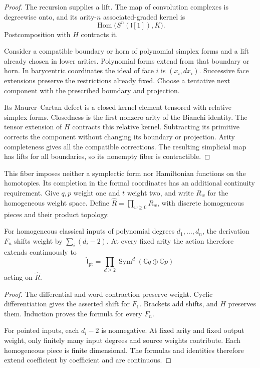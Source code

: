 \begin{proof}
The recursion supplies a lift. The map of convolution complexes
is degreewise onto, and its arity-$n$ associated-graded kernel is
\[
 \operatorname{Hom}\bigl(S^n(\mathfrak l[1]),K\bigr).
\]
Postcomposition with $H$ contracts it.

Consider a compatible boundary or horn of polynomial simplex
forms and a lift already chosen in lower arities. Polynomial
forms extend from that boundary or horn. In barycentric
coordinates the ideal of face $i$ is $(x_i,dx_i)$.
Successive face extensions preserve the restrictions already
fixed. Choose a tentative next component with the prescribed
boundary and projection.

Its Maurer--Cartan defect is a closed kernel element tensored
with relative simplex forms. Closedness is the first nonzero
arity of the Bianchi identity. The tensor extension of $H$
contracts this relative kernel. Subtracting its primitive
corrects the component without changing its boundary or
projection. Arity completeness gives all the compatible
corrections. The resulting simplicial map has lifts for all
boundaries, so its nonempty fiber is contractible.
\end{proof}

This fiber imposes neither a symplectic form nor Hamiltonian
functions on the homotopies. Its completion in the formal
coordinates has an additional continuity requirement.
Give $q,p$ weight one and $t$ weight two, and write
$R_w$ for the homogeneous weight space. Define
$\widehat R=\prod_{w\geq0}R_w$, with discrete homogeneous
pieces and their product topology.

\begin{proposition}\label{mht:prop:pointed-action-completion}
For homogeneous classical inputs of polynomial degrees
$d_1,\ldots,d_n$, the derivation $F_n$ shifts weight by
$\sum_i(d_i-2)$. At every fixed arity the action therefore
extends continuously to
\[
 \widehat{\mathfrak l}_{\mathrm{pt}}
 =\prod_{d\geq2}\operatorname{Sym}^d(\mathbb Cq\oplus\mathbb Cp)
\]
acting on $\widehat R$.
\end{proposition}

\begin{proof}
The differential and word contraction preserve weight.
Cyclic differentiation gives the asserted shift for $F_1$.
Brackets add shifts, and $H$ preserves them. Induction proves
the formula for every $F_n$.

For pointed inputs, each $d_i-2$ is nonnegative. At fixed
arity and fixed output weight, only finitely many input
degrees and source weights contribute. Each homogeneous
piece is finite dimensional. The formulas and identities
therefore extend coefficient by coefficient and are continuous.
\end{proof}

